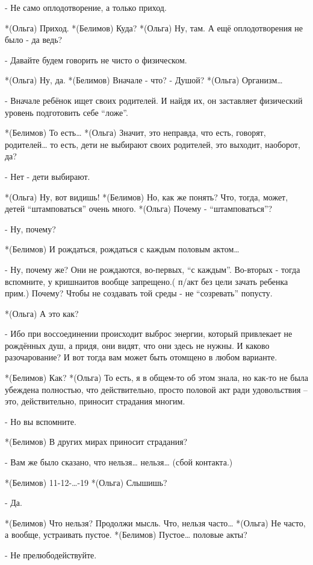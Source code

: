 - Не само оплодотворение, а только приход.

*(Ольга) Приход.
*(Белимов) Куда?
*(Ольга) Ну, там. А ещё оплодотворения не было - да ведь?

- Давайте будем говорить не чисто о физическом.

*(Ольга) Ну, да.
*(Белимов) Вначале - что? - Душой?
*(Ольга) Организм…

- Вначале ребёнок ищет своих родителей. И найдя их, он заставляет физический уровень подготовить себе “ложе”.

*(Белимов) То есть…
*(Ольга) Значит, это неправда, что есть, говорят, родителей… то есть, дети не выбирают своих родителей, это выходит, наоборот, да?

- Нет -  дети выбирают.

*(Ольга) Ну, вот видишь!
*(Белимов) Но, как же понять?  Что, тогда, может, детей “штамповаться” очень много.
*(Ольга) Почему  -  “штамповаться”?

- Ну, почему?

*(Белимов) И рождаться, рождаться с каждым половым актом…

- Ну, почему же? Они не рождаются, во-первых, “с каждым”. Во-вторых - тогда вспомните, у кришнаитов вообще запрещено.( п/акт без цели зачать ребенка прим.) Почему? Чтобы не создавать той среды - не “созревать” попусту.

*(Ольга) А это как?

- Ибо при воссоединении происходит выброс энергии, который привлекает не рождённых душ, а придя, они видят, что они здесь не нужны. И каково разочарование? И вот тогда вам может быть отомщено в любом варианте.

*(Белимов) Как?
*(Ольга) То есть, я в общем-то об этом знала, но как-то не была убеждена полностью, что действительно, просто половой акт ради удовольствия – это, действительно, приносит страдания многим.

- Но вы вспомните.

*(Белимов) В других мирах приносит страдания?

- Вам же было сказано, что нельзя… нельзя…
(сбой контакта.)

*(Белимов) 11-12-…-19
*(Ольга) Слышишь?

- Да.

*(Белимов) Что нельзя? Продолжи мысль. Что, нельзя часто…
*(Ольга) Не часто, а вообще, устраивать пустое.
*(Белимов) Пустое… половые акты?

- Не прелюбодействуйте.

